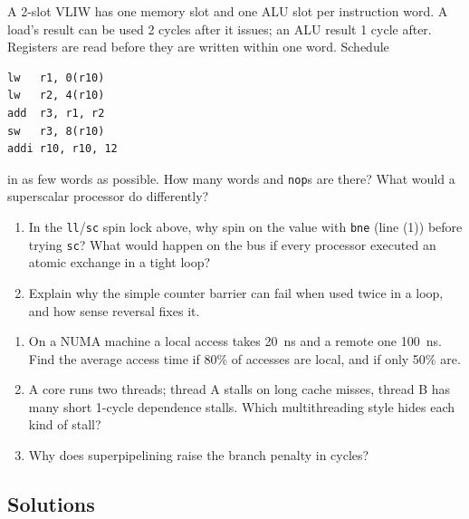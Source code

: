 \begin{exercise}\label{q:mp-vliw}
A 2-slot VLIW has one memory slot and one ALU slot per instruction word. A load's
result can be used 2 cycles after it issues; an ALU result 1 cycle after. Registers
are read before they are written within one word. Schedule
\begin{lstlisting}
lw   r1, 0(r10)
lw   r2, 4(r10)
add  r3, r1, r2
sw   r3, 8(r10)
addi r10, r10, 12
\end{lstlisting}
in as few words as possible. How many words and \texttt{nop}s are there? What would a
superscalar processor do differently?
\end{exercise}

\begin{exercise}\label{q:mp-sync}
\leavevmode
\begin{enumerate}[label=(\alph*),leftmargin=*]
  \item In the \texttt{ll}/\texttt{sc} spin lock above, why spin on the value with
  \texttt{bne} (line (1)) before trying \texttt{sc}? What would happen on the bus if
  every processor executed an atomic exchange in a tight loop?
  \item Explain why the simple counter barrier can fail when used twice in a loop,
  and how sense reversal fixes it.
\end{enumerate}
\end{exercise}

\begin{exercise}\label{q:mp-misc}
\leavevmode
\begin{enumerate}[label=(\alph*),leftmargin=*]
  \item On a NUMA machine a local access takes 20~ns and a remote one 100~ns. Find
  the average access time if 80\% of accesses are local, and if only 50\% are.
  \item A core runs two threads; thread A stalls on long cache misses, thread B has
  many short 1-cycle dependence stalls. Which multithreading style hides each kind of
  stall?
  \item Why does superpipelining raise the branch penalty in cycles?
\end{enumerate}
\end{exercise}

\subsection{Solutions}
\label{sec:mp-sol}

